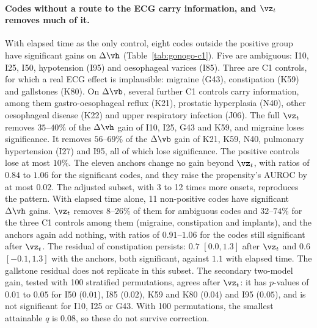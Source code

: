 \paragraph{Codes without a route to the ECG carry information, and $\vz_t$ removes much of it.} With elapsed time as the only control, eight codes outside the positive group have significant gains on $\Delta\vh$ (Table~\ref{tab:gonogo-c1}). Five are ambiguous: I10, I25, I50, hypotension (I95) and oesophageal varices (I85). Three are C1 controls, for which a real ECG effect is implausible: migraine (G43), constipation (K59) and gallstones (K80). On $\Delta\vb$, several further C1 controls carry information, among them gastro-oesophageal reflux (K21), prostatic hyperplasia (N40), other oesophageal disease (K22) and upper respiratory infection (J06). The full $\vz_t$ removes $35$--$40\%$ of the $\Delta\vh$ gain of I10, I25, G43 and K59, and migraine loses significance. It removes $56$--$69\%$ of the $\Delta\vb$ gain of K21, K59, N40, pulmonary hypertension (I27) and I95, all of which lose significance. The positive controls lose at most $10\%$. The eleven anchors change no gain beyond $\vz_t$, with ratios of $0.84$ to $1.06$ for the significant codes, and they raise the propensity's AUROC by at most $0.02$. The adjusted subset, with 3 to 12 times more onsets, reproduces the pattern. With elapsed time alone, 11 non-positive codes have significant $\Delta\vh$ gains. $\vz_t$ removes $8$--$26\%$ of them for ambiguous codes and $32$--$74\%$ for the three C1 controls among them (migraine, constipation and implants), and the anchors again add nothing, with ratios of $0.91$--$1.06$ for the codes still significant after $\vz_t$. The residual of constipation persists: $0.7$ $[0.0, 1.3]$ after $\vz_t$ and $0.6$ $[-0.1, 1.3]$ with the anchors, both significant, against $1.1$ with elapsed time. The gallstone residual does not replicate in this subset. The secondary two-model gain, tested with 100 stratified permutations, agrees after $\vz_t$: it has $p$-values of $0.01$ to $0.05$ for I50 ($0.01$), I85 ($0.02$), K59 and K80 ($0.04$) and I95 ($0.05$), and is not significant for I10, I25 or G43. With 100 permutations, the smallest attainable $q$ is $0.08$, so these do not survive correction.

